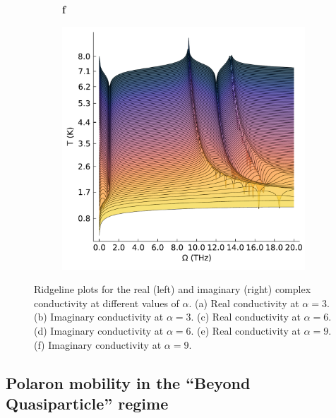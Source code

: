 \begin{figure}[h]
{\begin{subfigure}[b]{.58\textwidth}
\end{subfigure}%
\begin{subfigure}[t]{0.01\textwidth}
    \vspace*{-7.5cm}\textbf{f}
  \end{subfigure}%
\begin{subfigure}[b]{.58\textwidth}
\centering
\includegraphics[width=.87\textwidth]{chapters/frohlich/figures/conductivity_plot_temp_imag_9.pdf}
\end{subfigure}%
}
\caption{Ridgeline plots for the real (left) and imaginary (right) complex conductivity at different values of $\alpha$. (a) Real conductivity at $\alpha = 3$. (b) Imaginary conductivity at $\alpha = 3$. (c) Real conductivity at $\alpha = 6$. (d) Imaginary conductivity at $\alpha = 6$. (e) Real conductivity at $\alpha = 9$. (f) Imaginary conductivity at $\alpha = 9$.}
\label{fig:osakaridge}
\end{figure}

\subsection{Polaron mobility in the ``Beyond Quasiparticle'' regime}

